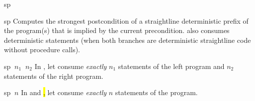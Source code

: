 \begin{tactic}{sp}
  \begin{tsyntax}{sp}
  Computes the strongest postcondition of a straightline deterministic
  prefix of the program(s) that is implied by the current
  precondition.  also consumes deterministic 
  statements (when both branches are deterministic straightline code
  without procedure calls).
  \end{tsyntax}

  \begin{tsyntax}{sp $\ n_1$ $\ n_2$}
  In \prhl, let  consume \emph{exactly} $n_1$ statements of
  the left program and $n_2$ statements of the right program.
  \end{tsyntax}

  \begin{tsyntax}{sp $\ n$}
  In \phl and \hl, let  consume \emph{exactly} $n$ statements
  of the program.
  \end{tsyntax}
\end{tactic}
